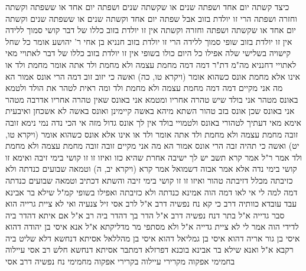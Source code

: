 \documentclass[12pt, openany]{book}
\begin{document}
{כיצד קשתה יום אחד ושפתה שנים או שקשתה שנים ושפתה יום אחד או ששפתה וקשתה וחזרה ושפתה הרי זו יולדת בזוב 
אבל שפתה יום אחד וקשתה שנים או ששפתה שנים וקשתה יום אחד או שקשתה ושפתה וחזרה וקשתה אין זו יולדת בזוב כללו של דבר קושי סמוך ללידה אין זו יולדת בזוב שופי סמוך ללידה הרי זו יולדת בזוב 
חנניא בן אחי ר' יהושע אומר כל שחל קישויה בשלישי שלה אפילו כל היום כולו בשופי אין זו יולדת בזוב 
כללו של דבר לאתויי מאי לאתויי דחנניא 
מה"מ דת"ר דמה דמה מחמת עצמה ולא מחמת ולד 
אתה אומר מחמת ולד או אינו אלא מחמת אונס כשהוא אומר (ויקרא טו, כה) ואשה כי יזוב זוב דמה הרי אונס אמור הא מה אני מקיים דמה דמה מחמת עצמה ולא מחמת ולד 
ומה ראית לטהר את הולד ולטמא באונס מטהר אני בולד שיש טהרה אחריו ומטמא אני באונס שאין טהרה אחריו 
אדרבה מטהר אני באונס שכן אונס בזב טהור השתא מיהא באשה קיימינן ואונס באשה לא אשכחן 
ואיבעית אימא מאי דעתיך לטהורי באונס ולטמויי בולד אין לך אונס גדול מזה 
אי הכי נדה נמי נימא זובה זובה מחמת עצמה ולא מחמת ולד 
אתה אומר ולד או אינו אלא אונס כשהוא אומר (ויקרא טו, יט) ואשה כי תהיה זבה הרי אונס אמור הא מה אני מקיים זובה זובה מחמת עצמה ולא מחמת ולד 
אמר ר"ל אמר קרא תשב יש לך ישיבה אחרת שהיא כזו ואיזו זו זו קושי בימי זיבה ואימא זו קושי בימי נדה 
אלא אמר אבוה דשמואל אמר קרא (ויקרא יב, ה) וטמאה שבועים כנדתה ולא כזיבתה מכלל דזיבתה טהור ואיזו זו זו קושי בימי זיבה 
והשתא דכתיב וטמאה שבועים כנדתה דמה למה לי אי לאו דמה הוה אמינא כנדתה ולא כזיבתה ואפילו בשופי קמ"ל 
שילא בר אבינא עבד עובדא כוותיה דרב כי קא נח נפשיה דרב א"ל לרב אסי זיל צנעיה ואי לא ציית גרייה הוא סבר גדייה א"ל 
בתר דנח נפשיה דרב א"ל הדר בך דהדר ביה רב א"ל אם איתא דהדר ביה לדידי הוה אמר לי לא ציית גדייה א"ל ולא מסתפי מר מדליקתא 
א"ל אנא איסי בן יהודה דהוא איסי בן גור אריה דהוא איסי בן גמליאל דהוא איסי בן מהללאל אסיתא דנחשא דלא שליט ביה רקבא א"ל ואנא שילא בר אבינא בוכנא דפרזלא דמתבר אסיתא דנחשא 
חלש רב אסי עיילוה בחמימי אפקוה מקרירי עיילוה בקרירי אפקוה מחמימי נח נפשיה דרב אסי}
\end{document}
